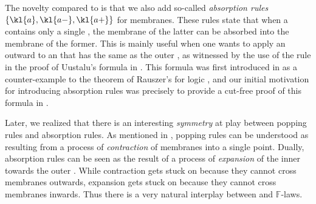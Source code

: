 \begin{description}
  The novelty compared to  is that we also add so-called
  \emph{absorption rules} $\{\kl{a},\kl{a{-}},\kl{a{+}}\}$ for membranes.
  These rules state that when a  contains only a single  ,
  the membrane of the latter can be absorbed into the membrane of the former.
  This is mainly useful when one wants to apply an outward  to
  an  that has the same  as the outer , as witnessed by the
  use of the  rule in the proof of Uustalu's formula in
  . This formula was first introduced in
   as a counter-example to the 
  theorem of Rauszer's  for  logic
  , and our initial motivation for
  introducing absorption rules was precisely to provide a cut-free proof of this
  formula in .

  Later, we realized that there is an interesting \emph{symmetry} at play
  between popping rules and absorption rules. As mentioned in
  , popping rules can be understood as resulting from a
  process of \emph{contraction} of membranes into a single point. Dually,
  absorption rules can be seen as the result of a process of \emph{expansion} of
  the inner  towards the outer . While contraction gets stuck on
    because they cannot cross  membranes outwards,
  expansion gets stuck on   because they cannot cross 
  membranes inwards. Thus there is a very natural interplay between
   and $\mathbb{F}$-laws.
\end{description}